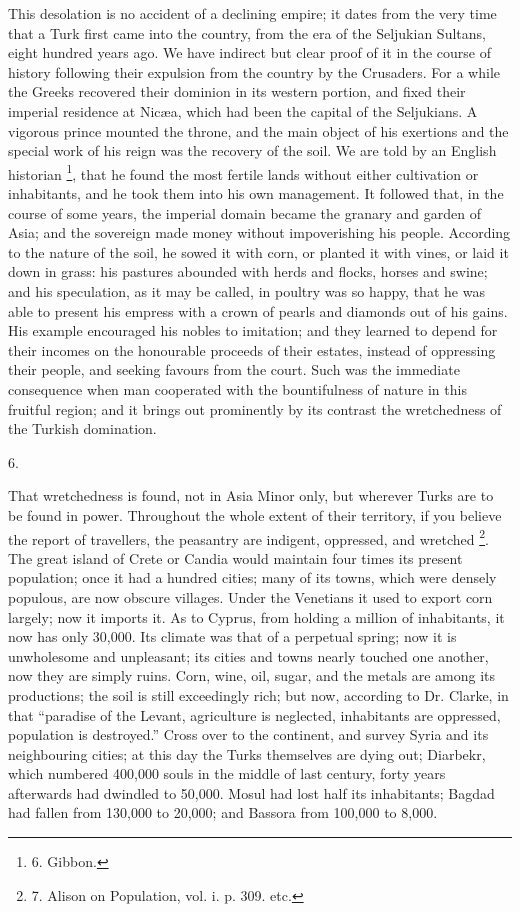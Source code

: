 This desolation is no accident
of a declining empire; it dates from the very time that a Turk first
came into the country, from the era of the Seljukian Sultans, eight
hundred years ago. We have indirect but clear proof of it in the
course of history following their expulsion from the country by the
Crusaders. For a while the Greeks recovered their dominion in its
western portion, and fixed their imperial residence at Nicæa, which
had been the capital of the Seljukians. A vigorous prince mounted the
throne, and the main object of his exertions and the special work of
his reign was the recovery of the soil. We are told by an English
historian \footnote{6.
Gibbon.}, that he found
the most fertile lands without either cultivation or inhabitants, and
he took them into his own management. It followed that, in the course
of some years, the imperial domain became the granary and garden of
Asia; and the sovereign made money without impoverishing his people.
According to the nature of the soil, he sowed it with corn, or planted
it with vines, or laid it down in grass: his pastures abounded with
herds and flocks, horses and swine; and his speculation, as it may
be called, in poultry was so happy, that he was able to present
his empress with a crown of pearls and diamonds out of his gains. His
example encouraged his nobles to imitation; and they learned to depend
for their incomes on the honourable proceeds of their estates, instead
of oppressing their people, and seeking favours from the court. Such
was the immediate consequence when man cooperated with the
bountifulness of nature in this fruitful region; and it brings out
prominently by its contrast the wretchedness of the Turkish
domination.

6.

That wretchedness is found,
not in Asia Minor only, but wherever Turks are to be found in power.
Throughout the whole extent of their territory, if you believe the
report of travellers, the peasantry are indigent, oppressed, and
wretched \footnote{7.
Alison on Population, vol. i. p. 309. etc.}. The great
island of Crete or Candia would maintain four times its present
population; once it had a hundred cities; many of its towns, which
were densely populous, are now obscure villages. Under the Venetians
it used to export corn largely; now it imports it. As to Cyprus, from
holding a million of inhabitants, it now has only 30,000. Its climate
was that of a perpetual spring; now it is unwholesome and unpleasant;
its cities and towns nearly touched one another, now they are simply
ruins. Corn, wine, oil, sugar, and the metals are among its
productions; the soil is still exceedingly rich; but now, according to
Dr. Clarke, in that ``paradise of the Levant, agriculture is neglected,
inhabitants are oppressed, population is destroyed.'' Cross over to the
continent, and survey Syria and its neighbouring cities; at this day
the Turks themselves are dying out; Diarbekr, which numbered 400,000
souls in the middle of last century, forty years afterwards had
dwindled to 50,000. Mosul had lost half its inhabitants; Bagdad had
fallen from 130,000 to 20,000; and Bassora from 100,000 to 8,000.

